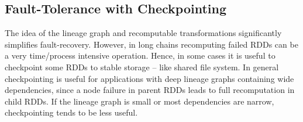 \subsection{Fault-Tolerance with Checkpointing}
\label{sp:fault}
The idea of the lineage graph and recomputable transformations significantly simplifies fault-recovery. However, in long chains recomputing failed RDDs can be a very time/process intensive operation. Hence, in some cases it is useful to checkpoint some RDDs to stable storage -- like shared file system. In general checkpointing is useful for applications with deep lineage graphs containing wide dependencies, since a node failure in parent RDDs leads to full recomputation in child RDDs. If the lineage graph is small or most dependencies are narrow, checkpointing tends to be less useful. 

